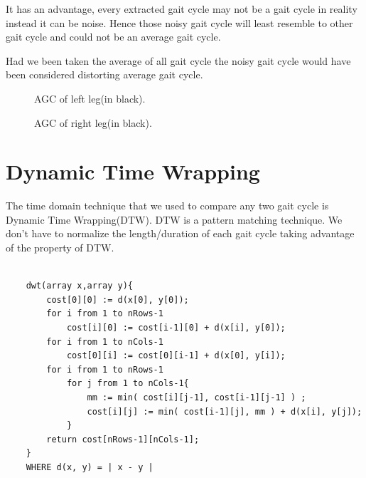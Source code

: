 It has an advantage, every extracted gait cycle may not be a gait cycle in reality instead it can be noise. Hence those noisy gait cycle will least resemble to other gait cycle and could not be an average gait cycle. 

Had we been taken the average of all gait cycle the noisy gait cycle would have been considered distorting average gait cycle.

\begin{figure}
\caption{AGC of left leg(in black).}
\end{figure}

\begin{figure}
\caption{AGC of right leg(in black).}
\end{figure}


\section{Dynamic Time Wrapping}
The time domain technique that we used to compare any two gait cycle is Dynamic Time Wrapping(DTW)\cite{dtw1}. DTW is a pattern matching technique. We don’t have to normalize the length/duration of each gait cycle taking advantage of the property of DTW.


\begin{verbatim}

    dwt(array x,array y){
        cost[0][0] := d(x[0], y[0]);
        for i from 1 to nRows-1 
            cost[i][0] := cost[i-1][0] + d(x[i], y[0]);
        for i from 1 to nCols-1
            cost[0][i] := cost[0][i-1] + d(x[0], y[i]);
        for i from 1 to nRows-1
            for j from 1 to nCols-1{
                mm := min( cost[i][j-1], cost[i-1][j-1] ) ;
                cost[i][j] := min( cost[i-1][j], mm ) + d(x[i], y[j]);
            }
        return cost[nRows-1][nCols-1];
    }
    WHERE d(x, y) = | x - y |
\end{verbatim} \cite{dtw1}
